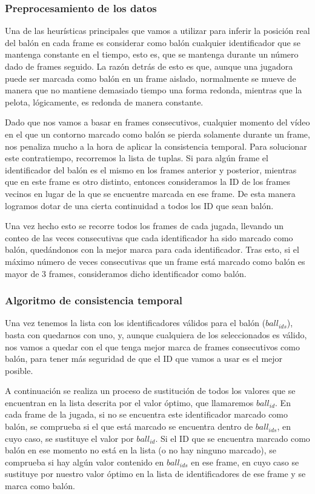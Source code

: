 \subsubsection*{Preprocesamiento de los datos}
Una de las heurísticas principales que vamos a utilizar para inferir la posición real del balón en cada frame es considerar como balón cualquier identificador que se mantenga constante en el tiempo, esto es, que se mantenga durante un número dado de frames seguido. La razón detrás de esto es que, aunque una jugadora puede ser marcada como balón en un frame aislado, normalmente se mueve de manera que no mantiene demasiado tiempo una forma redonda, mientras que la pelota, lógicamente, es redonda de manera constante.

Dado que nos vamos a basar en frames consecutivos, cualquier momento del vídeo en el que un contorno marcado como balón se pierda solamente durante un frame, nos penaliza mucho a la hora de aplicar la consistencia temporal. Para solucionar este contratiempo, recorremos la lista de tuplas. Si para algún frame el identificador del balón es el mismo en los frames anterior y posterior, mientras que en este frame es otro distinto, entonces consideramos la ID de los frames vecinos en lugar de la que se encuentre marcada en ese frame. De esta manera logramos dotar de una cierta continuidad a todos los ID que sean balón.

Una vez hecho esto se recorre todos los frames de cada jugada, llevando un conteo de las veces consecutivas que cada identificador ha sido marcado como balón, quedándonos con la mejor marca para cada identificador. Tras esto, si el máximo número de veces consecutivas que un frame está marcado como balón es mayor de 3 frames, consideramos dicho identificador como balón. 

\subsubsection*{Algoritmo de consistencia temporal}
Una vez tenemos la lista con los identificadores válidos para el balón ($ball_{ids}$), basta con quedarnos con uno, y, aunque cualquiera de los seleccionados es válido, nos vamos a quedar con el que tenga mejor marca de frames consecutivos como balón, para tener más seguridad de que el ID que vamos a usar es el mejor posible.

A continuación se realiza un proceso de sustitución de todos los valores que se encuentran en la lista descrita por el valor óptimo, que llamaremos $ball_{id}$. En cada frame de la jugada, si no se encuentra este identificador marcado como balón, se comprueba si el que está marcado se encuentra dentro de $ball_{ids}$, en cuyo caso, se sustituye el valor por $ball_{id}$. Si el ID que se encuentra marcado como balón en ese momento no está en la lista (o no hay ninguno marcado), se comprueba si hay algún valor contenido en $ball_{ids}$ en ese frame, en cuyo caso se sustituye por nuestro valor óptimo en la lista de identificadores de ese frame y se marca como balón.

